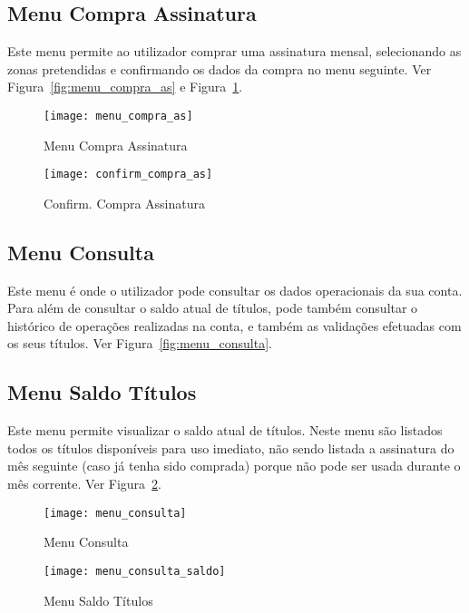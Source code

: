 \subsection{Menu Compra Assinatura}

Este menu permite ao utilizador comprar uma assinatura mensal, selecionando as zonas pretendidas e confirmando os dados da compra no menu seguinte. Ver Figura~\ref{fig:menu_compra_as} e Figura~\ref{fig:confirm_compra_as}.

\begin{figure}[ht]
\begin{minipage}[b]{0.45\linewidth}
\centering
\texttt{[image: menu\_compra\_as]}
    \caption{Menu Compra Assinatura}
    \label{fig:menu_compra_as}
\end{minipage}
\hspace{0.5cm}
\begin{minipage}[b]{0.45\linewidth}
\centering
    \texttt{[image: confirm\_compra\_as]}
    \caption{Confirm. Compra Assinatura}
    \label{fig:confirm_compra_as}
\end{minipage}
\end{figure}

\subsection{Menu Consulta}

Este menu é onde o utilizador pode consultar os dados operacionais da sua conta. Para além de consultar o saldo atual de títulos, pode também consultar o histórico de operações realizadas na conta, e também as validações efetuadas com os seus títulos. Ver Figura~\ref{fig:menu_consulta}.

\subsection{Menu Saldo Títulos}

Este menu permite visualizar o saldo atual de títulos. Neste menu são listados todos os títulos disponíveis para uso imediato, não sendo listada a assinatura do mês seguinte (caso já tenha sido comprada) porque não pode ser usada durante o mês corrente. Ver Figura~\ref{fig:menu_consulta_saldo}.

\begin{figure}[ht]
\begin{minipage}[b]{0.45\linewidth}
\centering
\texttt{[image: menu\_consulta]}
    \caption{Menu Consulta}
    \label{fig:menu_consulta}
\end{minipage}
\hspace{0.5cm}
\begin{minipage}[b]{0.45\linewidth}
\centering
    \texttt{[image: menu\_consulta\_saldo]}
    \caption{Menu Saldo Títulos}
    \label{fig:menu_consulta_saldo}
\end{minipage}
\end{figure}

